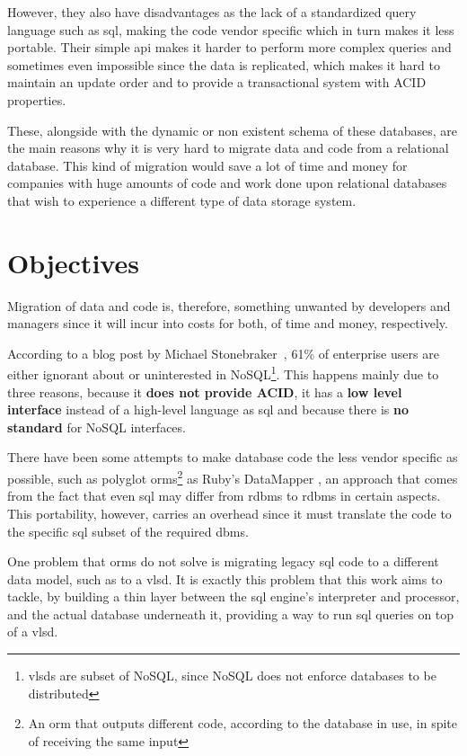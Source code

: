 However, they also have disadvantages as the lack of a standardized query language such as \ac{sql}, making the code vendor specific which in turn makes it less portable. Their simple \ac{api} makes it harder to perform more complex queries and sometimes even impossible since the data is replicated, which makes it hard to maintain an update order and to provide a transactional system with ACID properties. 

These, alongside with the dynamic or non existent schema of these databases, are the main reasons why it is very hard to migrate data and code from a relational database. This kind of migration would save a lot of time and money for companies with huge amounts of code and work done upon relational databases that wish to experience a different type of data storage system.

\section{Objectives}

Migration of data and code is, therefore, something unwanted by developers and managers since it will incur into costs for both, of time and money, respectively. 

According to a blog post by Michael Stonebraker~\cite{stoneEnter}, 61\% of enterprise users are either ignorant about or uninterested in NoSQL\footnote{\acp{vlsd} are subset of NoSQL, since NoSQL does not enforce databases to be distributed}. This happens mainly due to three reasons, because it \textbf{does not provide ACID}, it has a \textbf{low level interface} instead of a high-level language as \ac{sql} and because there is \textbf{no standard} for NoSQL interfaces.

There have been some attempts to make database code the less vendor specific as possible, such as polyglot \acp{orm}\footnote{An orm that outputs different code, according to the database in use, in spite of receiving the same input} as Ruby's DataMapper \cite{DM}, an approach that comes from the fact that even \ac{sql} may differ from \ac{rdbms} to \ac{rdbms} in certain aspects. This portability, however, carries an overhead since it must translate the code to the specific \ac{sql} subset of the required \ac{dbms}.

One problem that \acp{orm} do not solve is migrating legacy \ac{sql} code to a different data model, such as to a \ac{vlsd}. It is exactly this problem that this work aims to tackle, by building a thin layer between the \ac{sql} engine's interpreter and processor, and the actual database underneath it, providing a way to run \ac{sql} queries on top of a \ac{vlsd}.

